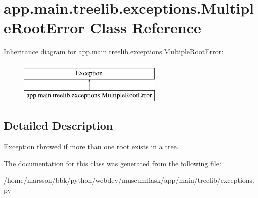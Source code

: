 \hypertarget{classapp_1_1main_1_1treelib_1_1exceptions_1_1MultipleRootError}{}\section{app.\+main.\+treelib.\+exceptions.\+Multiple\+Root\+Error Class Reference}
\label{classapp_1_1main_1_1treelib_1_1exceptions_1_1MultipleRootError}
Inheritance diagram for app.\+main.\+treelib.\+exceptions.\+Multiple\+Root\+Error\+:\begin{figure}[H]
\begin{center}
\leavevmode
\includegraphics[height=2.000000cm]{classapp_1_1main_1_1treelib_1_1exceptions_1_1MultipleRootError}
\end{center}
\end{figure}


\subsection{Detailed Description}
\begin{DoxyVerb}Exception throwed if more than one root exists in a tree.\end{DoxyVerb}
 

The documentation for this class was generated from the following file\+:\begin{DoxyCompactItemize}
\item 
/home/nlarsson/bbk/python/webdev/museumflask/app/main/treelib/exceptions.\+py\end{DoxyCompactItemize}
